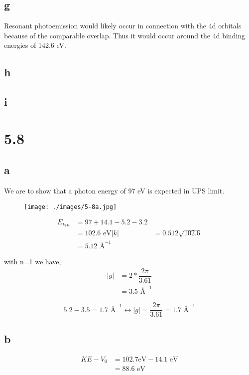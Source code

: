 \documentclass[12pt]{article}
\renewcommand{\=}[1]{\stackrel{#1}{=}} %
\theoremstyle{definition}
\theoremstyle{remark}
\begin{document}
\subsection*{g}
Resonant photoemission would likely occur in connection with the 4d orbitals because of the comparable overlap. Thus it would occur around the 4d binding energies of 142.6 eV.

\subsection*{h}

\subsection*{i}



\newpage
\section*{5.8}

\subsection*{a}

We are to show that a photon energy of 97 eV is expected in UPS limit.
\begin{figure}[H]
\centering
\texttt{[image: ./images/5-8a.jpg]}
\label{5-8a}
\end{figure}

\begin{align*}
E_{kin} &= 97 + 14.1 - 5.2 - 3.2\\[3mm]
	&= 102.6\text{ eV}
|k| &= 0.512\sqrt{102.6}\\[3mm]
	&= 5.12\text{ \AA}^{-1}
\end{align*}

with n=1 we have,
\begin{align*}
|g| &= 2* \dfrac{2\pi}{3.61}\\[3mm]
	&= 3.5\text{ \AA}^{-1}
\end{align*}

\[
5.2-3.5 = 1.7\text{ \AA}^{-1} \leftrightarrow |g| = \dfrac{2\pi}{3.61} = 1.7\text{ \AA}^{-1}
\]


\subsection*{b}
\begin{align*}
KE - V_0 &= 102.7\text {eV} - 14.1\text{ eV}\\[3mm]
	&= 88.6\text{ eV}
\end{align*}
\end{document}
